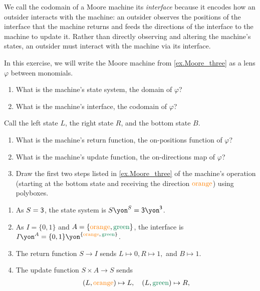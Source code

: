 \documentclass[Book-Poly]{subfiles}
\begin{document}
We call the codomain of a Moore machine its \emph{interface} because it encodes how an outsider interacts with the machine: an outsider observes the positions of the interface that the machine returns and feeds the directions of the interface to the machine to update it.
Rather than directly observing and altering the machine's states, an outsider must interact with the machine via its interface.


\begin{exercise}
In this exercise, we will write the Moore machine from \cref{ex.Moore_three} as a lens $\varphi$ between monomials.
\begin{enumerate}
    \item What is the machine's state system, the domain of $\varphi$?
    \item What is the machine's interface, the codomain of $\varphi$?
\end{enumerate}
Call the left state $L$, the right state $R$, and the bottom state $B$.
\begin{enumerate}[resume]
    \item What is the machine's return function, the on-positions function of $\varphi$?
    \item What is the machine's update function, the on-directions map of $\varphi$?
    \item Draw the first two steps listed in \cref{ex.Moore_three} of the machine's operation (starting at the bottom state and receiving the direction ${\color{orange}\text{orange}}$) using polyboxes.
    \qedhere
\end{enumerate}
\begin{solution}
\begin{enumerate}
    \item As $S=\textsf{3}$, the state system is $S\yon^S=\3\yon^\3$.
    \item As $I=\{0,1\}$ and $A=\{{\color{orange}\text{orange}},{\color{dgreen}\text{green}}\}$, the interface is $I\yon^A=\{0,1\}\yon^{\{{\color{orange}\text{orange}},\,{\color{dgreen}\text{green}}\}}$.
    \item The return function $S\to I$ sends $L\mapsto 0, R\mapsto 1,$ and $B\mapsto 1$.
    \item The update function $S\times A\to S$ sends
    \begin{align*}
        (L, {\color{orange}\text{orange}})\mapsto L&,\quad(L, {\color{dgreen}\text{green}})\mapsto R, \\

\end{align*}
\end{enumerate}
\end{solution}
\end{exercise}
\end{document}

